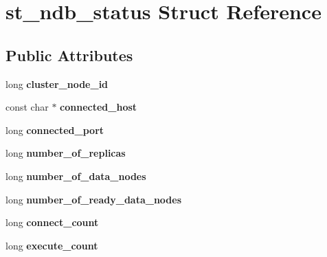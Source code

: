 \hypertarget{structst__ndb__status}{}\section{st\+\_\+ndb\+\_\+status Struct Reference}
\label{structst__ndb__status}
\subsection*{Public Attributes}
\begin{DoxyCompactItemize}
\item 
\mbox{\label{structst__ndb__status_a5bc6a774427f92afedef09de091a6f46}} 
long {\bfseries cluster\+\_\+node\+\_\+id}
\item 
\mbox{\label{structst__ndb__status_a91c06367edb1d4e57d4cdc3d53a083e5}} 
const char $\ast$ {\bfseries connected\+\_\+host}
\item 
\mbox{\label{structst__ndb__status_a21e0f31e20ffcb5f8dea2f94f5ccd632}} 
long {\bfseries connected\+\_\+port}
\item 
\mbox{\label{structst__ndb__status_af8a0d59b8936501c33155964ca838275}} 
long {\bfseries number\+\_\+of\+\_\+replicas}
\item 
\mbox{\label{structst__ndb__status_a95d2ada0334e0a92b9c8d6f8809a5e4f}} 
long {\bfseries number\+\_\+of\+\_\+data\+\_\+nodes}
\item 
\mbox{\label{structst__ndb__status_af21652ea9591e624dc6e7dffa839f3b7}} 
long {\bfseries number\+\_\+of\+\_\+ready\+\_\+data\+\_\+nodes}
\item 
\mbox{\label{structst__ndb__status_ab7fa85df4f3d906cd1c092a43932173d}} 
long {\bfseries connect\+\_\+count}
\item 
\mbox{\label{structst__ndb__status_a532eab4e2ec815ec732f1836dab46178}} 
long {\bfseries execute\+\_\+count}
\item 
\mbox{\label{structst__ndb__status_a7b691cff82a164d1f08f18fe20a1883f}} 

\end{DoxyCompactItemize}
